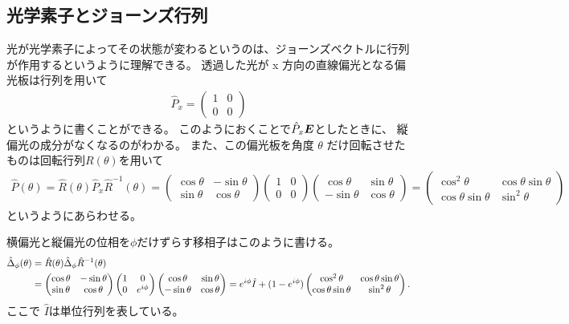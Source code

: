 \documentclass[9pt,dvipdfmx,a4paper]{jsarticle}
\begin{document}
\subsection{光学素子とジョーンズ行列}
光が光学素子によってその状態が変わるというのは、ジョーンズベクトルに行列が作用するというように理解できる。
透過した光が x 方向の直線偏光となる偏光板は行列を用いて
\begin{align}
    \hat{P}_x =
    \begin{pmatrix}
        1 & 0\\
        0 & 0
    \end{pmatrix}
\end{align}
というように書くことができる。
このようにおくことで\(\hat{P}_x \vb*{E}\)としたときに、
縦偏光の成分がなくなるのがわかる。
また、この偏光板を角度 \(\theta\) だけ回転させたものは回転行列\(R(\theta)\)を用いて
\begin{align}
    \hat{P}(\theta) = \hat{R}(\theta)\hat{P}_x \hat{R}^{-1}(\theta)
    = \begin{pmatrix}
        \cos \theta & -\sin\theta\\
        \sin\theta & \cos\theta
    \end{pmatrix}
    \begin{pmatrix}
        1 & 0\\
        0 & 0
    \end{pmatrix}
    \begin{pmatrix}
        \cos \theta & \sin\theta\\
        -\sin\theta & \cos\theta
    \end{pmatrix}
    =\begin{pmatrix}
        \cos^2 \theta & \cos\theta\sin\theta\\
        \cos\theta\sin\theta & \sin^2\theta
    \end{pmatrix}
\end{align}
というようにあらわせる。

横偏光と縦偏光の位相を\(\phi\)だけずらす移相子はこのように書ける。
\begin{align}
    \hat{\Delta}_\phi(\theta) &= \hat{R}(\theta) \hat{\Delta}_\phi  \hat{R}^{-1}(\theta) \notag\\
    &= \begin{pmatrix}
        \cos \theta & -\sin\theta\\
        \sin\theta & \cos\theta
    \end{pmatrix}
    \begin{pmatrix}
        1 & 0\\
        0 & e^{i\phi}
    \end{pmatrix}
    \begin{pmatrix}
        \cos \theta & \sin\theta\\
        -\sin\theta & \cos\theta
    \end{pmatrix}
    =e^{i\phi} \hat{I} + (1-e^{i\phi})\begin{pmatrix}
        \cos^2 \theta & \cos\theta\sin\theta\\
        \cos\theta\sin\theta & \sin^2\theta
    \end{pmatrix}.
\end{align}
ここで \(\hat{I}\)は単位行列を表している。
\end{document}
